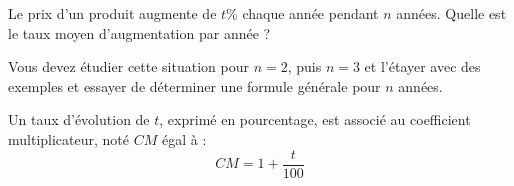 \documentclass[10pt]{article}
\begin{document}
\begin{Sit}
Le prix d'un produit augmente de $t$\% chaque année pendant $n$ années. Quelle est le taux moyen d'augmentation par année ?


Vous devez étudier cette situation pour $n=2$, puis $n=3$ et l'étayer avec des exemples et essayer de déterminer une formule générale pour $n$ années.  
\end{Sit}

\begin{Rap}

Un taux d'évolution de $t$, exprimé en pourcentage, est associé au coefficient multiplicateur, noté $CM$ égal à : $$CM=1+\frac{t}{100}$$

\end{Rap}






  
 


 
 
%
% 
\end{document}
